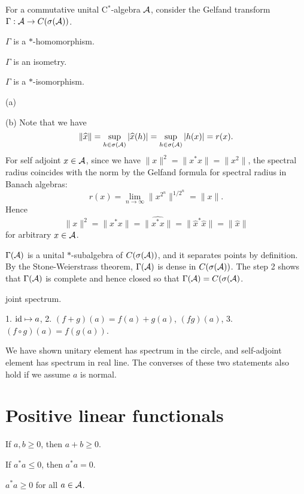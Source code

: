 \documentclass{../note}
\begin{document}
\begin{prb}
For a commutative unital C$^*$-algebra $\mathcal{A}$, consider the Gelfand transform $\Gamma:\mathcal{A}\to C(\sigma(\mathcal{A}))$.
\begin{parts}
\item $\Gamma$ is a $*$-homomorphism.
\item $\Gamma$ is an isometry.
\item $\Gamma$ is a $*$-isomorphism.
\end{parts}
\end{prb}
\begin{pf}
(a)

(b)
Note that we have
\[\|\widehat x\|=\sup_{h\in\sigma(\mathcal{A})}|\widehat x(h)|=\sup_{h\in\sigma(\mathcal{A})}|h(x)|=r(x).\]
For self adjoint $x\in\mathcal{A}$, since we have $\|x\|^2=\|x^*x\|=\|x^2\|$, the spectral radius coincides with the norm by the Gelfand formula for spectral radius in Banach algebras:
\[r(x)=\lim_{n\to\infty}\|x^{2^n}\|^{1/2^n}=\|x\|.\]
Hence
\[\|x\|^2=\|x^*x\|=\|\hat{x^*x}\|=\|\hat{x}^*\hat{x}\|=\|\hat{x}\|\]
for arbitrary $x\in\mathcal{A}$.


$\Gamma(\mathcal{A})$ is a unital $*$-subalgebra of $C(\sigma(\mathcal{A}))$, and it separates points by definition.
By the Stone-Weierstrass theorem, $\Gamma(\mathcal{A})$ is dense in $C(\sigma(\mathcal{A}))$.
The step 2 shows that $\Gamma(\mathcal{A})$ is complete and hence closed so that $\Gamma(\mathcal{A})=C(\sigma(\mathcal{A})$.
\end{pf}



\begin{prb}
joint spectrum.
\end{prb}


\begin{prb}
1. $\operatorname{id}\mapsto a$, 2. $(f+g)(a)=f(a)+g(a)$, $(fg)(a)$, 3. $(f\circ g)(a)=f(g(a))$.
\end{prb}


We have shown unitary element has spectrum in the circle, and self-adjoint element has spectrum in real line. The converses of these two statements also hold if we assume $a$ is normal.




\section{Positive linear functionals}


\begin{prb}

\begin{parts}
\item If $a,b\ge0$, then $a+b\ge0$.
\item If $a^*a\le0$, then $a^*a=0$.
\item $a^*a\ge0$ for all $a\in\mathcal{A}$.
\end{parts}
\end{prb}
\end{document}
